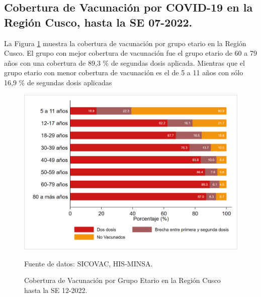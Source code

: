 \documentclass[12pt,a4paper,openany]{book}
\begin{document}
	\subsection*{Cobertura de Vacunación por COVID-19 en la Región Cusco, hasta la SE 07-2022.}
\noindent La Figura \ref{fig:vacuna_edad} muestra la cobertura de vacunación por grupo etario en la Región Cusco. El grupo con mejor cobertura de vacunación fue el grupo etario de 60 a 79 años con una cobertura de 89,3 $\%$ de  segundas dosis aplicada. 
Mientras que el grupo etario con menor cobertura de vacunación es el de 5 a 11 años con sólo 16,9 $\%$ de segundas dosis aplicadas 

\begin{figure}[h]
	\caption{Cobertura de Vacunación por Grupo Etario en la Región Cusco hasta la SE 12-2022. }\label{fig:vacuna_edad}
	\begin{center}
		\includegraphics[width=0.90\linewidth]{../figuras/vacunacion_grupo_edad.png}
	\end{center}
	{\footnotesize {Fuente de datos: SICOVAC, HIS-MINSA.}}
\end{figure}
\clearpage
\end{document}

